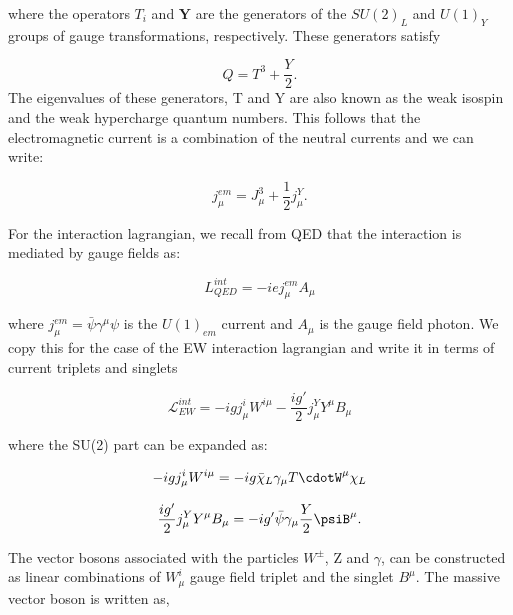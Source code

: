 where the operators $T_{i}$ and $\textbf{Y}$ are the generators of the $SU(2)_{L}$ and $U(1)_{Y}$ groups of gauge transformations, respectively. These generators satisfy 

\begin{equation}
    \label{eq:ConservationElectroweakQNum}
   Q = T^3 + \frac{Y}{2}.
\end{equation}
The eigenvalues of these generators, T and Y are also known as the weak isospin and the weak hypercharge quantum numbers. This follows that the electromagnetic current is a combination of the neutral currents and we can write:


\begin{equation}
    \label{eq:ConservationElectroweakCurrent}
   j^{em}_{\mu}= J^3_{\mu} + \frac{1}{2}j^{Y}_{\mu}.
\end{equation}

For the interaction lagrangian, we recall from QED that the interaction is mediated by gauge fields as:

\begin{equation} 
\label{eq:QEDint}
L^{int}_{QED} = -iej^{em}_{\mu} A_{\mu}
\end{equation}

where $j^{em}_{\mu} = \bar{\psi}\gamma^\mu\psi
$ is the $U(1)_{em}$ current and $A_{\mu}$ is the gauge field photon. We copy this for the case of the EW interaction lagrangian and write it in terms of current triplets and singlets

\begin{equation} 
\label{eq:QEDint}
\mathcal{L}^{int}_{EW} = -igj^{i}_{\mu} W^{i\mu} - \frac{ig'}{2} j^{Y}_{\mu} Y^\mu B_\mu
\end{equation}

where the SU(2) part can be expanded as:

\begin{equation} 
\label{eq:SU(2)current}
-igj^{i}_{\mu} W^{i\mu} = -ig\bar{\chi}_L\gamma_{\mu}T\cdotW^{\mu}\chi_{L}
\end{equation}

\begin{equation} 
\label{eq:U(1)}
\frac{ig'}{2} j^{Y}_{\mu} Y^\mu B_\mu = -ig'\bar{\psi}\gamma_{\mu}\frac{Y}{2} \psiB^{\mu}. 
\end{equation}

The vector bosons associated with the particles $W^{\pm}$, Z and $\gamma$, can be constructed as linear combinations of $W^{i}_{\mu}$ gauge field triplet and the singlet $B^{\mu}$. The massive vector boson is written as,

